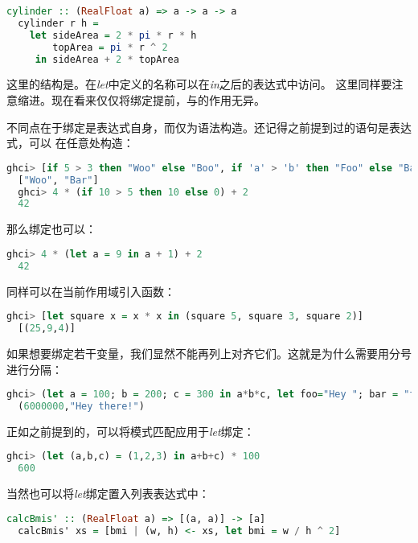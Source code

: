 \documentclass[./main.tex]{subfiles}
\begin{document}
\begin{lstlisting}[language=Haskell]
  cylinder :: (RealFloat a) => a -> a -> a
  cylinder r h =
    let sideArea = 2 * pi * r * h
        topArea = pi * r ^ 2
     in sideArea + 2 * topArea
\end{lstlisting}

这里的结构是。在\textit{let}中定义的名称可以在\textit{in}之后的表达式中访问。
这里同样要注意缩进。现在看来仅仅将绑定提前，与的作用无异。

不同点在于绑定是表达式自身，而仅为语法构造。还记得之前提到过的语句是表达式，可以
在任意处构造：

\begin{lstlisting}[language=Haskell]
  ghci> [if 5 > 3 then "Woo" else "Boo", if 'a' > 'b' then "Foo" else "Bar"]
  ["Woo", "Bar"]
  ghci> 4 * (if 10 > 5 then 10 else 0) + 2
  42
\end{lstlisting}

那么绑定也可以：

\begin{lstlisting}[language=Haskell]
  ghci> 4 * (let a = 9 in a + 1) + 2
  42
\end{lstlisting}

同样可以在当前作用域引入函数：

\begin{lstlisting}[language=Haskell]
  ghci> [let square x = x * x in (square 5, square 3, square 2)]
  [(25,9,4)]
\end{lstlisting}

如果想要绑定若干变量，我们显然不能再列上对齐它们。这就是为什么需要用分号进行分隔：

\begin{lstlisting}[language=Haskell]
  ghci> (let a = 100; b = 200; c = 300 in a*b*c, let foo="Hey "; bar = "there!" in foo ++ bar)
  (6000000,"Hey there!")
\end{lstlisting}

正如之前提到的，可以将模式匹配应用于\textit{let}绑定：

\begin{lstlisting}[language=Haskell]
  ghci> (let (a,b,c) = (1,2,3) in a+b+c) * 100
  600
\end{lstlisting}

当然也可以将\textit{let}绑定置入列表表达式中：

\begin{lstlisting}[language=Haskell]
  calcBmis' :: (RealFloat a) => [(a, a)] -> [a]
  calcBmis' xs = [bmi | (w, h) <- xs, let bmi = w / h ^ 2]
\end{lstlisting}
\end{document}
